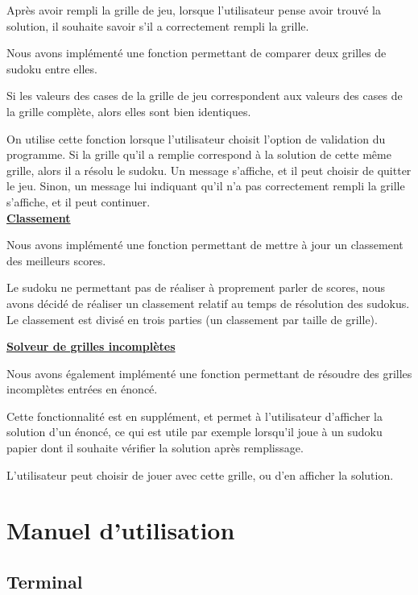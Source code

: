 \documentclass[a4paper, 12pt]{article}
\begin{document}
	\par Après avoir rempli la grille de jeu, lorsque l'utilisateur pense avoir trouvé la solution, il souhaite savoir s'il a correctement rempli la grille.
	\par Nous avons implémenté une fonction permettant de comparer deux grilles de sudoku entre elles.
	\par Si les valeurs des cases de la grille de jeu correspondent aux valeurs des cases de la grille complète, alors elles sont bien identiques.
	\par On utilise cette fonction lorsque l'utilisateur choisit l'option de validation du programme. Si la grille qu'il a remplie correspond à la solution de cette même grille, alors il a résolu le sudoku. Un message s'affiche, et il peut choisir de quitter le jeu. Sinon, un message lui indiquant qu'il n'a pas correctement rempli la grille s'affiche, et il peut continuer.\\

\underline{\textbf{Classement}}

	\par Nous avons implémenté une fonction permettant de mettre à jour un classement des meilleurs scores.
	\par Le sudoku ne permettant pas de réaliser à proprement parler de scores, nous avons décidé de réaliser un classement relatif au temps de résolution des sudokus. Le classement est divisé en trois parties (un classement par taille de grille).

\underline{\textbf{Solveur de grilles incomplètes}}
	
	\par Nous avons également implémenté une fonction permettant de résoudre des grilles incomplètes entrées en énoncé.
	\par Cette fonctionnalité est en supplément, et permet à l'utilisateur d'afficher la solution d'un énoncé, ce qui est utile par exemple lorsqu'il joue à un sudoku papier dont il souhaite vérifier la solution après remplissage.
	\par L'utilisateur peut choisir de jouer avec cette grille, ou d'en afficher la solution.

\clearpage
\section{Manuel d'utilisation}

\subsection{Terminal}
\end{document}
